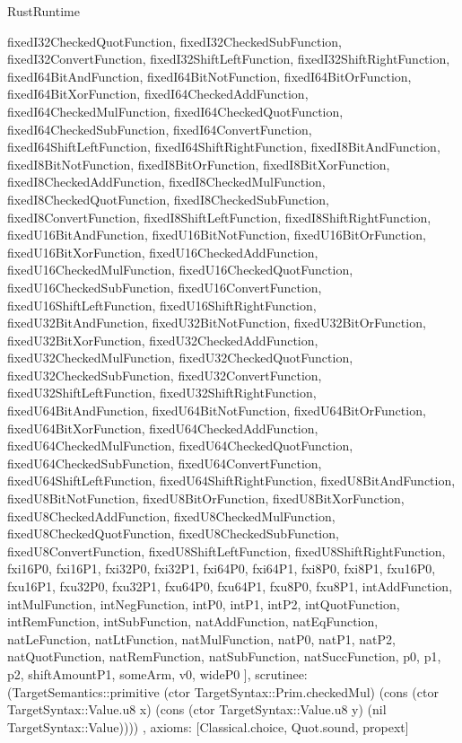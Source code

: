 \begin{lexlean}{RustRuntime}
\begin{semanticmodule}
{{      fixedI32CheckedQuotFunction,
      fixedI32CheckedSubFunction,
      fixedI32ConvertFunction,
      fixedI32ShiftLeftFunction,
      fixedI32ShiftRightFunction,
      fixedI64BitAndFunction,
      fixedI64BitNotFunction,
      fixedI64BitOrFunction,
      fixedI64BitXorFunction,
      fixedI64CheckedAddFunction,
      fixedI64CheckedMulFunction,
      fixedI64CheckedQuotFunction,
      fixedI64CheckedSubFunction,
      fixedI64ConvertFunction,
      fixedI64ShiftLeftFunction,
      fixedI64ShiftRightFunction,
      fixedI8BitAndFunction,
      fixedI8BitNotFunction,
      fixedI8BitOrFunction,
      fixedI8BitXorFunction,
      fixedI8CheckedAddFunction,
      fixedI8CheckedMulFunction,
      fixedI8CheckedQuotFunction,
      fixedI8CheckedSubFunction,
      fixedI8ConvertFunction,
      fixedI8ShiftLeftFunction,
      fixedI8ShiftRightFunction,
      fixedU16BitAndFunction,
      fixedU16BitNotFunction,
      fixedU16BitOrFunction,
      fixedU16BitXorFunction,
      fixedU16CheckedAddFunction,
      fixedU16CheckedMulFunction,
      fixedU16CheckedQuotFunction,
      fixedU16CheckedSubFunction,
      fixedU16ConvertFunction,
      fixedU16ShiftLeftFunction,
      fixedU16ShiftRightFunction,
      fixedU32BitAndFunction,
      fixedU32BitNotFunction,
      fixedU32BitOrFunction,
      fixedU32BitXorFunction,
      fixedU32CheckedAddFunction,
      fixedU32CheckedMulFunction,
      fixedU32CheckedQuotFunction,
      fixedU32CheckedSubFunction,
      fixedU32ConvertFunction,
      fixedU32ShiftLeftFunction,
      fixedU32ShiftRightFunction,
      fixedU64BitAndFunction,
      fixedU64BitNotFunction,
      fixedU64BitOrFunction,
      fixedU64BitXorFunction,
      fixedU64CheckedAddFunction,
      fixedU64CheckedMulFunction,
      fixedU64CheckedQuotFunction,
      fixedU64CheckedSubFunction,
      fixedU64ConvertFunction,
      fixedU64ShiftLeftFunction,
      fixedU64ShiftRightFunction,
      fixedU8BitAndFunction,
      fixedU8BitNotFunction,
      fixedU8BitOrFunction,
      fixedU8BitXorFunction,
      fixedU8CheckedAddFunction,
      fixedU8CheckedMulFunction,
      fixedU8CheckedQuotFunction,
      fixedU8CheckedSubFunction,
      fixedU8ConvertFunction,
      fixedU8ShiftLeftFunction,
      fixedU8ShiftRightFunction,
      fxi16P0,
      fxi16P1,
      fxi32P0,
      fxi32P1,
      fxi64P0,
      fxi64P1,
      fxi8P0,
      fxi8P1,
      fxu16P0,
      fxu16P1,
      fxu32P0,
      fxu32P1,
      fxu64P0,
      fxu64P1,
      fxu8P0,
      fxu8P1,
      intAddFunction,
      intMulFunction,
      intNegFunction,
      intP0,
      intP1,
      intP2,
      intQuotFunction,
      intRemFunction,
      intSubFunction,
      natAddFunction,
      natEqFunction,
      natLeFunction,
      natLtFunction,
      natMulFunction,
      natP0,
      natP1,
      natP2,
      natQuotFunction,
      natRemFunction,
      natSubFunction,
      natSuccFunction,
      p0,
      p1,
      p2,
      shiftAmountP1,
      someArm,
      v0,
      wideP0
    ],
    scrutinee: (TargetSemantics::primitive (ctor TargetSyntax::Prim.checkedMul) (cons (ctor TargetSyntax::Value.u8 x) (cons (ctor TargetSyntax::Value.u8 y) (nil TargetSyntax::Value))))
  },
  axioms: [Classical.choice, Quot.sound, propext]
}


\end{semanticmodule}
\end{lexlean}
